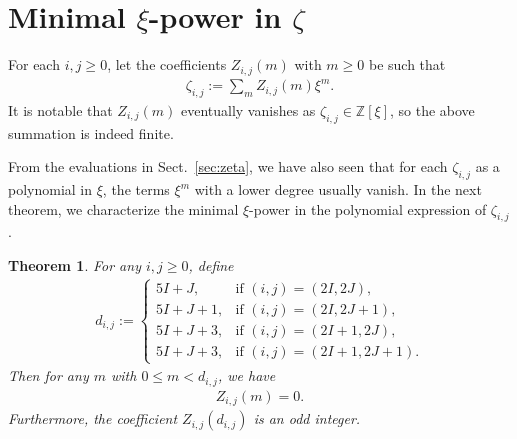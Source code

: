 \documentclass[12pt,reqno]{amsart}
\numberwithin{equation}{section}
\theoremstyle{theorem}
\newtheorem{theorem}{Theorem}
\theoremstyle{definition}
\begin{document}
\section{Minimal $\xi$-power in $\zeta$}

For each $i,j\ge 0$, let the coefficients $Z_{i,j}(m)$ with $m\ge 0$ be such that
\begin{align*}
	\zeta_{i,j}:= \sum_{m} Z_{i,j}(m)\xi^m.
\end{align*}
It is notable that $Z_{i,j}(m)$ eventually vanishes as $\zeta_{i,j}\in \mathbb{Z}[\xi]$, so the above summation is indeed finite. 

From the evaluations in Sect.~\ref{sec:zeta}, we have also seen that for each $\zeta_{i,j}$ as a polynomial in $\xi$, the terms $\xi^m$ with a lower degree usually vanish. In the next theorem, we characterize the minimal $\xi$-power in the polynomial expression of $\zeta_{i,j}$.


\begin{theorem}\label{th:Z-nonvanishing}
	For any $i,j\ge 0$, define
	\begin{align*}
		d_{i,j}:=\begin{cases}
			5I+J, & \text{if $(i,j)=(2I,2J)$},\\
			5I+J+1, & \text{if $(i,j)=(2I,2J+1)$},\\
			5I+J+3, & \text{if $(i,j)=(2I+1,2J)$},\\
			5I+J+3, & \text{if $(i,j)=(2I+1,2J+1)$}.
		\end{cases}
	\end{align*}
	Then for any $m$ with $0\le m< d_{i,j}$, we have
	\begin{align*}
		Z_{i,j}(m) = 0.
	\end{align*}
	Furthermore, the coefficient $Z_{i,j}(d_{i,j})$ is an odd integer.
\end{theorem}
\end{document}
